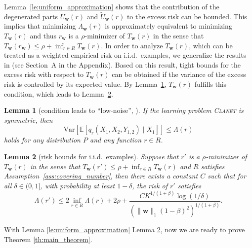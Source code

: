 \documentclass[letterpaper]{article} %
\newtheorem{lemma}{Lemma}
\newcommand{\E}{\mathbb{E}}
\newcommand{\Var}{\text{Var}}
\newcommand{\weight}{\mathbf{w}}
\newcommand{\distribution}{P}
\newcommand{\problemabbr}{\textnormal{C}\textsc{lanet}}
\newcommand{\normo}[1]{\|#1\|_1}
\newcommand{\complexbound}{\beta}
\newcommand{\red}[1]{\textcolor{red}{#1}}
\newcommand{\todo}[1]{\red{\textsc{todo:} #1}}
\begin{document}
Lemma~\ref{le:uniform_approximation} shows that the contribution of the degenerated parts $U_\weight{}(r)$ and $\widetilde{U}_\weight{}(r)$ to the excess risk can be bounded. 
This implies that minimizing $\Lambda_\weight{}(r)$ is approximately equivalent to minimizing $T_\weight{}(r)$ and thus $r_\weight{}$ is a $\rho$-minimizer of $T_\weight{}(r)$ in the sense that $T_\weight{}(r_\weight{})\le \rho+\inf_{r\in R}T_\weight{}(r)$.
In order to analyze $T_\weight{}(r)$, which can be treated as a weighted empirical risk on i.i.d.\ examples, we generalize the results in \cite{Massart2006} (see Section~A in the Appendix). 
Based on this result, tight bounds for the excess risk with respect to $T_\weight{}(r)$
can be obtained if the variance of the excess risk is controlled by its expected value.
By Lemma~\ref{le:variant_control}, $T_\weight{}(r)$ fulfills this condition, which leads to Lemma~\ref{le:risk_bounds_iid}.

\begin{lemma}[condition leads to ``low-noise'', {\cite[Lemma 2]{papa2016graph}}]
    \label{le:variant_control}
    If the learning problem \problemabbr{} is symmetric, then
    \begin{equation}
        \label{eq:variant_control}
        \Var\left[\E[q_r(X_1,X_2,Y_{1,2})\mid X_1]\right]\le \Lambda(r) 
    \end{equation}
    holds for any distribution $\distribution$ and any function $r\in R$.
\end{lemma}

\begin{lemma}[risk bounds for i.i.d.\ examples]
\label{le:risk_bounds_iid}
  Suppose that $r'$ is a $\rho$-minimizer of $T_\weight{}(r)$ in the sense that $T_\weight{}(r')\le \rho + \inf_{r\in R}T_\weight{}(r)$ and $R$ satisfies Assumption~\ref{ass:covering_number}, then there exists a constant $C$ such that for all $\delta\in(0,1]$, with probability at least $1-\delta$, the risk of $r'$ satisfies
  \[\Lambda(r')\le 2\inf_{r\in R}\Lambda(r)+2\rho+\frac{CK^{1/(1+\complexbound{})}\log(1/\delta)}{(\normo{\weight{}}(1-\complexbound{})^2)^{1/(1+\complexbound{})}}.\]
\end{lemma}


With Lemma \ref{le:uniform_approximation} Lemma \ref{le:risk_bounds_iid}, now we are ready to prove Theorem \ref{th:main_theorem}.
\end{document}
